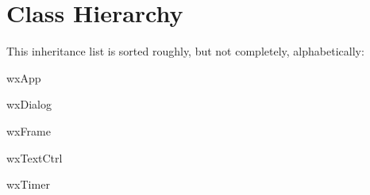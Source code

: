 \section{Class Hierarchy}
This inheritance list is sorted roughly, but not completely, alphabetically\+:\begin{DoxyCompactList}
\item wx\+App\begin{DoxyCompactList}
\item {}
\end{DoxyCompactList}
\item wx\+Dialog\begin{DoxyCompactList}
\item {}
\end{DoxyCompactList}
\item wx\+Frame\begin{DoxyCompactList}
\item {}
\end{DoxyCompactList}
\item wx\+Text\+Ctrl\begin{DoxyCompactList}
\item {}
\end{DoxyCompactList}
\item wx\+Timer\begin{DoxyCompactList}
\item {}
\end{DoxyCompactList}
\end{DoxyCompactList}
